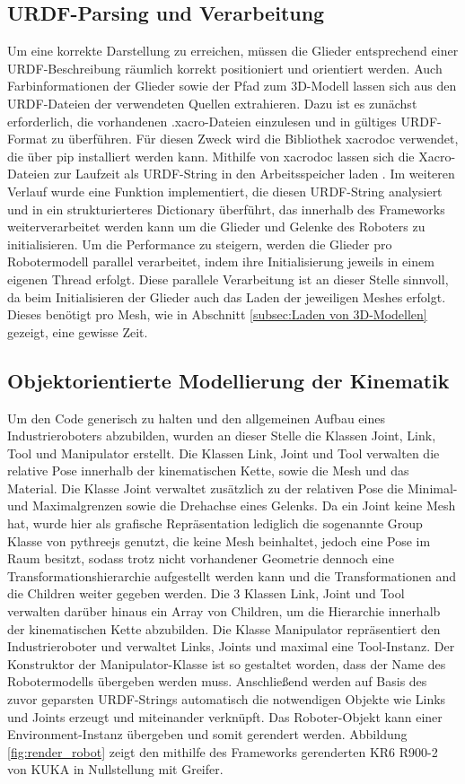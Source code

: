 \subsection{URDF-Parsing und Verarbeitung}
Um eine korrekte Darstellung zu erreichen, müssen die Glieder entsprechend einer URDF-Beschreibung räumlich korrekt positioniert und orientiert werden.
Auch Farbinformationen der Glieder sowie der Pfad zum 3D-Modell lassen sich aus den URDF-Dateien der verwendeten Quellen extrahieren.
Dazu ist es zunächst erforderlich, die vorhandenen .xacro-Dateien einzulesen und in gültiges URDF-Format zu überführen.
Für diesen Zweck wird die Bibliothek xacrodoc verwendet, die über pip installiert werden kann.
Mithilfe von xacrodoc lassen sich die Xacro-Dateien zur Laufzeit als URDF-String in den Arbeitsspeicher laden .
Im weiteren Verlauf wurde eine Funktion implementiert,
die diesen URDF-String analysiert und in ein strukturierteres Dictionary überführt,
das innerhalb des Frameworks weiterverarbeitet werden kann um die Glieder und Gelenke des Roboters zu initialisieren.
Um die Performance zu steigern, werden die Glieder pro Robotermodell parallel verarbeitet,
indem ihre Initialisierung jeweils in einem eigenen Thread erfolgt.
Diese parallele Verarbeitung ist an dieser Stelle sinnvoll,
da beim Initialisieren der Glieder auch das Laden der jeweiligen Meshes erfolgt.
Dieses benötigt pro Mesh, wie in Abschnitt \ref{subsec:Laden von 3D-Modellen} gezeigt, eine gewisse Zeit.



\subsection{Objektorientierte Modellierung der Kinematik}
Um den Code generisch zu halten und den allgemeinen Aufbau eines Industrieroboters abzubilden, wurden an dieser Stelle die Klassen Joint, Link, Tool und Manipulator erstellt.
Die Klassen Link, Joint und Tool verwalten die relative Pose innerhalb der kinematischen Kette, sowie die Mesh und das Material.
Die Klasse Joint verwaltet zusätzlich zu der relativen Pose die Minimal- und Maximalgrenzen sowie die Drehachse eines Gelenks.
Da ein Joint keine Mesh hat, wurde hier als grafische Repräsentation lediglich die sogenannte Group Klasse von pythreejs genutzt,
die keine Mesh beinhaltet, jedoch eine Pose im Raum besitzt,
sodass trotz nicht vorhandener Geometrie dennoch eine Transformationshierarchie aufgestellt werden kann und die Transformationen and die Children weiter gegeben werden.
Die 3 Klassen Link, Joint und Tool verwalten darüber hinaus ein Array von Children, um die Hierarchie innerhalb der kinematischen Kette abzubilden.
Die Klasse Manipulator repräsentiert den Industrieroboter und verwaltet Links, Joints und maximal eine Tool-Instanz.
Der Konstruktor der Manipulator-Klasse ist so gestaltet worden, dass der Name des Robotermodells übergeben werden muss.
Anschließend werden auf Basis des zuvor geparsten URDF-Strings automatisch die notwendigen Objekte wie Links und Joints erzeugt und miteinander verknüpft.
Das Roboter-Objekt kann einer Environment-Instanz übergeben und somit gerendert werden.
Abbildung \ref{fig:render_robot} zeigt den mithilfe des Frameworks gerenderten KR6 R900-2 von KUKA in Nullstellung mit Greifer.


